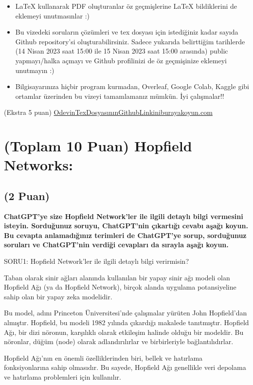 \documentclass[11pt]{article}
\begin{document}
\begin{itemize}
    \item LaTeX kullanarak PDF oluşturanlar öz geçmişlerine LaTeX bildiklerini de eklemeyi unutmasınlar :)
    \item Bu vizedeki soruların çözümleri ve tex dosyası için istediğiniz kadar sayıda Github repository'si oluşturabilirsiniz. Sadece yukarıda belirttiğim tarihlerde (14 Nisan 2023 saat 15:00 ile 15 Nisan 2023 saat 15:00 arasında) public yapmayı/halka açmayı ve Github profilinizi de öz geçmişinize eklemeyi unutmayın :)
    \item Bilgisayarınıza hiçbir program kurmadan, Overleaf, Google Colab, Kaggle gibi ortamlar üzerinden bu vizeyi tamamlamanız mümkün. İyi çalışmalar!!
\end{itemize}

(Ekstra 5 puan) \url{OdevinTexDosyasınınGithubLinkiniburayakoyun.com}

\newpage
\section{(Toplam 10 Puan) Hopfield Networks:}

\subsection{(2 Puan)} \textbf{ChatGPT’ye size Hopfield Network’ler ile ilgili detaylı bilgi vermesini isteyin. Sorduğunuz soruyu, ChatGPT'nin çıkartığı cevabı aşağı koyun. Bu cevapta anlamadığınız terimleri de ChatGPT’ye sorup, sorduğunuz soruları ve ChatGPT’nin verdiği cevapları da sırayla aşağı koyun.}

SORU1: Hopfield Network'ler ile ilgili detaylı bilgi verirmisin?

Taban olarak sinir ağları alanında kullanılan bir yapay sinir ağı modeli olan Hopfield Ağı (ya da Hopfield Network), birçok alanda uygulama potansiyeline sahip olan bir yapay zeka modelidir.

Bu model, adını Princeton Üniversitesi'nde çalışmalar yürüten John Hopfield'dan almıştır. Hopfield, bu modeli 1982 yılında çıkardığı makalede tanıtmıştır. Hopfield Ağı, bir dizi nöronun, karşılıklı olarak etkileşim halinde olduğu bir modeldir. Bu nöronlar, düğüm (node) olarak adlandırılırlar ve birbirleriyle bağlantılıdırlar.

Hopfield Ağı'nın en önemli özelliklerinden biri, bellek ve hatırlama fonksiyonlarına sahip olmasıdır. Bu sayede, Hopfield Ağı genellikle veri depolama ve hatırlama problemleri için kullanılır.
\end{document}
